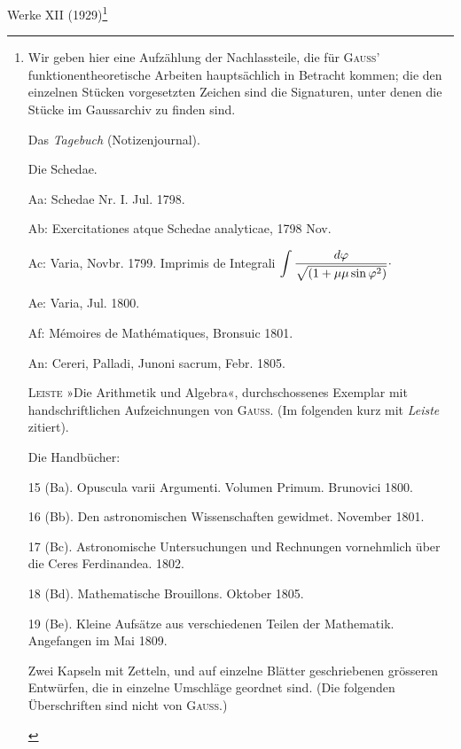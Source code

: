 Werke XII (1929)\footnote{Wir geben hier eine Aufzählung der Nachlassteile, die für \textsc{Gauss}’ funktionentheoretische Arbeiten hauptsächlich in Betracht kommen; die den einzelnen Stücken vorgesetzten Zeichen sind die Signaturen, unter denen die Stücke im Gaussarchiv zu finden sind.
\begin{list}{}{\setlength{\leftmargin}{1.7em}\setlength{\rightmargin}{0pt}\setlength{\itemsep}{0pt}\setlength{\parsep}{0pt}}
\item[1.] Das \textit{Tagebuch} (Notizenjournal).
\item[2.] Die Schedae.
\begin{list}{}{\setlength{\leftmargin}{1.4em}\setlength{\itemsep}{0pt}\setlength{\parsep}{0pt}}
\item Aa: Schedae Nr. I. Jul. 1798.
\item Ab: Exercitationes atque Schedae analyticae, 1798 Nov.
\item Ac: Varia, Novbr. 1799. Imprimis de Integrali \(\displaystyle\int\frac{d\varphi}{\sqrt{(1+\mu\mu\sin\varphi^2)}}\mathpunct{\vcenter{\hbox{.}}}\)
\item Ae: Varia, Jul. 1800.
\item Af: Mémoires de Mathématiques, Bronsuic 1801.
\item An: Cereri, Palladi, Junoni sacrum, Febr. 1805.
\end{list}
\item[3.] \textsc{Leiste} »Die Arithmetik und Algebra«, durchschossenes Exemplar mit handschriftlichen Aufzeichnungen von \textsc{Gauss}. (Im folgenden kurz mit \textit{Leiste} zitiert).
\item[4.] Die Handbücher:
\begin{list}{}{\setlength{\leftmargin}{1.4em}\setlength{\itemsep}{0pt}\setlength{\parsep}{0pt}}
\item 15 (Ba). Opuscula varii Argumenti. Volumen Primum. Brunovici 1800.
\item 16 (Bb). Den astronomischen Wissenschaften gewidmet. November 1801.
\item 17 (Bc). Astronomische Untersuchungen und Rechnungen vornehmlich über die Ceres Ferdinandea. 1802.
\item 18 (Bd). Mathematische Brouillons. Oktober 1805.
\item 19 (Be). Kleine Aufsätze aus verschiedenen Teilen der Mathematik. Angefangen im Mai 1809.
\end{list}
\item[5.] Zwei Kapseln mit Zetteln, und auf einzelne Blätter geschriebenen grösseren Entwürfen, die in einzelne Umschläge geordnet sind. (Die folgenden Überschriften sind nicht von \textsc{Gauss}.)

\end{list}}
